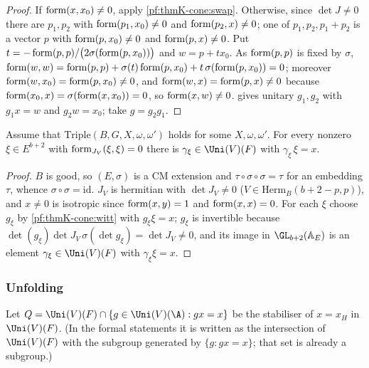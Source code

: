 \begin{proof}
If $\operatorname{form}(x,x_0)\neq0$, apply \cref{pf:thmK-cone:swap}.  Otherwise, since $\det J\neq0$ there are $p_1,p_2$ with
$\operatorname{form}(p_1,x_0)\neq0$ and $\operatorname{form}(p_2,x)\neq0$; one of $p_1,p_2,p_1+p_2$ is a vector $p$ with
$\operatorname{form}(p,x_0)\neq0$ and $\operatorname{form}(p,x)\neq0$.  Put
$t=-\operatorname{form}(p,p)/\bigl(2\sigma(\operatorname{form}(p,x_0))\bigr)$ and $w=p+tx_0$.  As $\operatorname{form}(p,p)$ is fixed by
$\sigma$, $\operatorname{form}(w,w)=\operatorname{form}(p,p)+\sigma(t)\operatorname{form}(p,x_0)+t\,\sigma(\operatorname{form}(p,x_0))=0$; moreover
$\operatorname{form}(w,x_0)=\operatorname{form}(p,x_0)\neq0$, and $\operatorname{form}(w,x)=\operatorname{form}(p,x)\neq0$ because
$\operatorname{form}(x_0,x)=\sigma(\operatorname{form}(x,x_0))=0$, so $\operatorname{form}(x,w)\neq0$.   gives
unitary $g_1,g_2$ with $g_1x=w$ and $g_2w=x_0$; take $g=g_2g_1$.
\end{proof}

\begin{lemma}\label{pf:thmK-cone:reps}
Assume that $\mathrm{Triple}(B,G,X,\omega,\omega')$ holds for some $X,\omega,\omega'$.  For every nonzero $\xi\in
E^{b+2}$ with $\operatorname{form}_{J_V}(\xi,\xi)=0$ there is $\gamma_\xi\in\Uni(V)(F)$ with $\gamma_\xi\,\xi=x$.
\end{lemma}

\begin{proof}
$B$ is good, so $(E,\sigma)$ is a CM extension and $\tau\circ\sigma\circ\sigma=\tau$ for an embedding $\tau$, whence
$\sigma\circ\sigma=\mathrm{id}$.  $J_V$ is hermitian with $\det J_V\neq0$ ($V\in\mathrm{Herm}_B(b+2-p,p)$), and $x\neq0$
is isotropic since $\operatorname{form}(x,y)=1$ and $\operatorname{form}(x,x)=0$.  For each $\xi$ choose $g_\xi$ by
\cref{pf:thmK-cone:witt} with $g_\xi\xi=x$; $g_\xi$ is invertible because
$\det(g_\xi)\det J_V\,\sigma(\det g_\xi)=\det J_V\neq0$, and its image in $\GL_{b+2}(\thmKconeAE)$ is an element
$\gamma_\xi\in\Uni(V)(F)$ with $\gamma_\xi\xi=x$.
\end{proof}

\subsubsection{Unfolding}
Let $\thmKconeStab=\Uni(V)(F)\cap\{g\in\Uni(V)(\A):gx=x\}$ be the stabiliser of $x=x_H$ in $\Uni(V)(F)$.  (In the
formal statements it is written as the intersection of $\Uni(V)(F)$ with the subgroup generated by
$\{g:gx=x\}$; that set is already a subgroup.)

